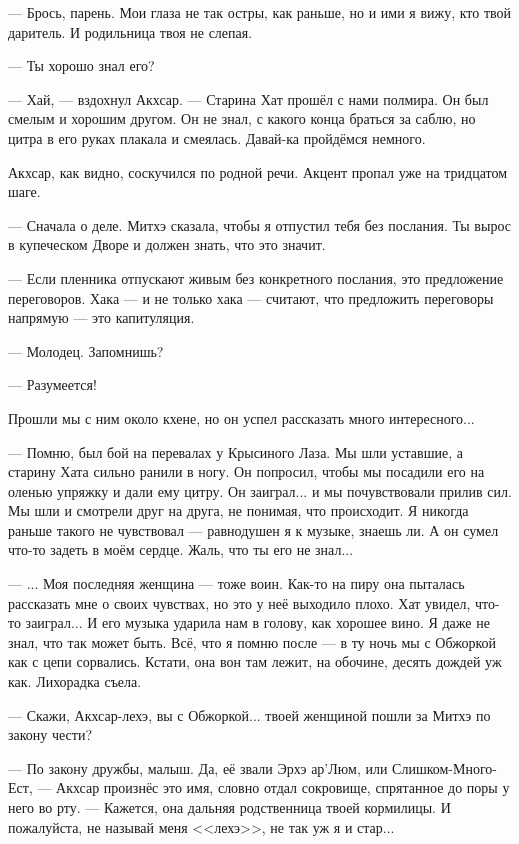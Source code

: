 --- Брось, парень.
Мои глаза не так остры, как раньше, но и ими я вижу, кто твой даритель.
И родильница твоя не слепая.

--- Ты хорошо знал его?

--- Хай, --- вздохнул Акхсар.
--- Старина Хат прошёл с нами полмира.
Он был смелым и хорошим другом.
Он не знал, с какого конца браться за саблю, но цитра в его руках плакала и смеялась.
Давай-ка пройдёмся немного.

Акхсар, как видно, соскучился по родной речи.
Акцент пропал уже на тридцатом шаге.

--- Сначала о деле.
Митхэ сказала, чтобы я отпустил тебя без послания.
Ты вырос в купеческом Дворе и должен знать, что это значит.

--- Если пленника отпускают живым без конкретного послания, это предложение переговоров.
Хака --- и не только хака --- считают, что предложить переговоры напрямую --- это капитуляция.

--- Молодец.
Запомнишь?

--- Разумеется!

Прошли мы с ним около кхене, но он успел рассказать много интересного...

--- Помню, был бой на перевалах у Крысиного Лаза.
Мы шли уставшие, а старину Хата сильно ранили в ногу.
Он попросил, чтобы мы посадили его на оленью упряжку и дали ему цитру.
Он заиграл... и мы почувствовали прилив сил.
Мы шли и смотрели друг на друга, не понимая, что происходит.
Я никогда раньше такого не чувствовал --- равнодушен я к музыке, знаешь ли.
А он сумел что-то задеть в моём сердце.
Жаль, что ты его не знал...

--- ... Моя последняя женщина --- тоже воин.
Как-то на пиру она пыталась рассказать мне о своих чувствах, но это у неё выходило плохо.
Хат увидел, что-то заиграл...
И его музыка ударила нам в голову, как хорошее вино.
Я даже не знал, что так может быть.
Всё, что я помню после --- в ту ночь мы с Обжоркой как с цепи сорвались.
Кстати, она вон там лежит, на обочине, десять дождей уж как.
Лихорадка съела.

--- Скажи, Акхсар-лехэ, вы с Обжоркой... твоей женщиной пошли за Митхэ по закону чести?

--- По закону дружбы, малыш.
Да, её звали Эрхэ ар’Люм, или Слишком-Много-Ест, --- Акхсар произнёс это имя, словно отдал сокровище, спрятанное до поры у него во рту.
--- Кажется, она дальняя родственница твоей кормилицы.
И пожалуйста, не называй меня <<лехэ>>, не так уж я и стар...

